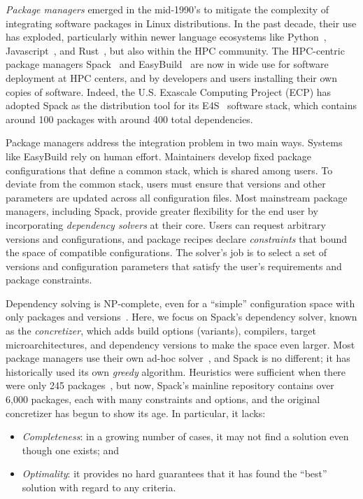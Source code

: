 {\it Package managers} emerged in the mid-1990's to mitigate the complexity of
integrating software packages in Linux distributions. In the past decade, their use has
exploded, particularly within newer language ecosystems like Python~\cite{pip},
Javascript~\cite{npm}, and Rust~\cite{cargo}, but also within the HPC community. The
HPC-centric package managers Spack~\cite{gamblin+:sc15} and
EasyBuild~\cite{hoste+:pyhpc12} are now in wide use for software deployment at HPC
centers, and by developers and users installing their own copies of software. Indeed,
the U.S. Exascale Computing Project (ECP) has adopted Spack as the distribution tool for
its E4S~\cite{e4s} software stack, which contains around 100 packages with around 400
total dependencies.

Package managers address the integration problem in two main ways. Systems like
EasyBuild rely on human effort. Maintainers develop fixed package configurations that
define a common stack, which is shared among users. To deviate from the common stack,
users must ensure that versions and other parameters are updated across all
configuration files. Most mainstream package managers, including Spack, provide greater
flexibility for the end user by incorporating {\it dependency solvers} at their core.
Users can request arbitrary versions and configurations, and package recipes declare
{\it constraints} that bound the space of compatible configurations. The solver's job is
to select a set of versions and configuration parameters that satisfy the user's
requirements and package constraints.

Dependency solving is NP-complete, even for a ``simple'' configuration space with only
packages and versions~\cite{dicosmo:edos,cox:version-sat}. Here, we focus on Spack's
dependency solver, known as the {\it concretizer}, which adds build options (variants),
compilers, target microarchitectures, and dependency versions to make the space even
larger. Most package managers use their own ad-hoc solver~\cite{abate2020dependency},
and Spack is no different; it has historically used its own {\it greedy} algorithm.
Heuristics were sufficient when there were only 245 packages~\cite{gamblin+:sc15}, but
now, Spack's mainline repository contains over 6,000 packages, each with many
constraints and options, and the original concretizer has begun to show its age. In
particular, it lacks:
\begin{itemize}
\item {\it Completeness}: in a growing number of cases, it may not find a solution even
  though one exists; and
\item {\it Optimality}: it provides no hard guarantees that it has found the ``best''
  solution with regard to any criteria.
\end{itemize}

